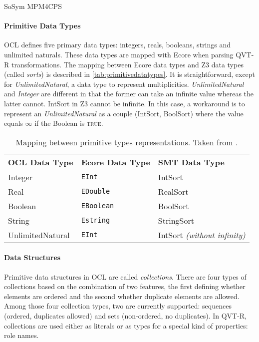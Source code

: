 \begin{copiedFrom}{SoSym MPM4CPS}
\paragraph{Primitive Data Types}

OCL defines five primary data types: integers, reals, booleans, strings and unlimited naturals. These data types are mapped with Ecore when parsing QVT-R transformations. The mapping between Ecore data types and Z3 data types (called \textit{sorts}) is described in \autoref{tab:primitivedatatypes}. It is straightforward, except for \textit{UnlimitedNatural}, a data type to represent multiplicities. \textit{UnlimitedNatural} and \textit{Integer} are different in that the former can take an infinite value whereas the latter cannot. IntSort in Z3 cannot be infinite. In this case, a workaround is to represent an \textit{UnlimitedNatural} as a couple (IntSort, BoolSort) where the value equals $\infty$ if the Boolean is \textsc{true}. %

\begin{table}
\small
\centering
\renewcommand{\arraystretch}{1.2}%
\setlength\tabcolsep{2 pt}
\begin{tabular}{L{2.6cm} L{2.6cm} L{3.5cm}}
\toprule
\textbf{OCL Data Type} & \textbf{Ecore Data Type} & \textbf{SMT Data Type} \\
\midrule
    Integer & \texttt{EInt} & IntSort \\
    Real    & \texttt{EDouble} & RealSort \\
    Boolean & \texttt{EBoolean} & BoolSort \\
    String  & \texttt{Estring} & StringSort \\
    UnlimitedNatural & \texttt{EInt} & IntSort \textit{(without infinity)}\\
\bottomrule
\end{tabular}
\caption[Mapping between primitive type representations]{Mapping between primitive types representations. Taken from .} %
\label{tab:primitivedatatypes}
\end{table}

\paragraph{Data Structures}
Primitive data structures in OCL are called \textit{collections}. There are four types of collections based on the combination of two features, the first defining whether elements are ordered and the second whether duplicate elements are allowed. Among those four collection types, two are currently supported: sequences (ordered, duplicates allowed) and sets (non-ordered, no duplicates). In QVT-R, collections are used either as literals or as types for a special kind of properties: role names.


\end{copiedFrom}
